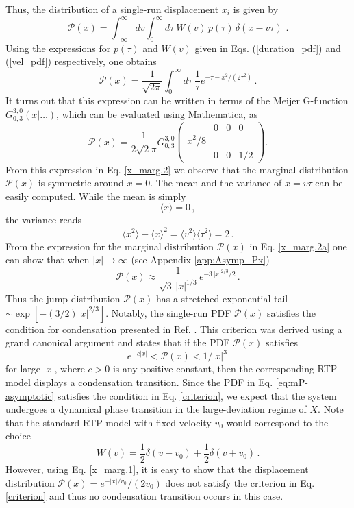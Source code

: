 \documentclass[aps,pre,twocolumn,superscriptaddress,showpacs]{revtex4-1}
\newcommand{\be}{\begin{equation}}
\newcommand{\ee}{\end{equation}}
\newcommand{\mP}{\mathcal{P}}
\begin{document}
Thus, the distribution of a single-run displacement $x_i$ is given by
\be
\mP(x)= \int_{-\infty}^{\infty} dv \int_0^{\infty}d\tau~ W(v)\,p(\tau)\,
\delta(x- v \tau)\, \,. 
\label{x_marg.1}
\ee
Using the expressions for $p(\tau)$ and $W(v)$ given in Eqs. 
(\ref{duration_pdf}) and (\ref{vel_pdf}) respectively, one obtains 
\be 
\mP(x)=\frac{1}{\sqrt{2\pi}}\int_{0}^{\infty}d\tau~\frac{1}{\tau}e^{-\tau-x^2/(2\tau^2)}\,.
\label{x_marg.2a}
\ee
It turns out that this expression can be written in terms of the Meijer G-function $G_{0,3}^{3,0}(x|\ldots)$, which can be evaluated using Mathematica, as
\be
\mP(x)= \frac{1}{2\sqrt{2}\pi} G_{0,3}^{3,0} \left(\begin{array}{c|ccc} & 0 & 0 & 0 \\ x^2/8 &  &  &  \\  & 0 & 0 & 1/2 \end{array}\right).
\label{x_marg.2}
\ee
From this expression in Eq. \eqref{x_marg.2} we observe that the marginal distribution $\mP(x)$ is symmetric around $x=0$. The mean and the variance of $x=v\tau$ can be easily computed. While the mean is simply 
\be
\langle x \rangle =0\,,
\label{mean_x}
\ee
the variance  reads
\be
\langle x^2\rangle- \langle x\rangle^2 =  \langle v^2\rangle \langle \tau^2\rangle =2\,.
\label{var_x}
\ee
From the expression for the marginal distribution $\mP(x)$ in Eq. \eqref{x_marg.2a} one can show that when $|x|\to \infty$ (see Appendix \ref{app:Asymp_Px})
\be \mP(x) \approx \frac{1 }{\sqrt{3}\,
  |x|^{1/3}}\, e^{-3\, | x|^{2/3}/2}\, .
\label{eq:mP-asymptotic}
\ee
Thus the jump distribution $\mP(x)$ has a stretched exponential tail $\sim 
\exp[-(3/2)|x|^{2/3}]$. Notably, the single-run PDF $\mP(x)$ satisfies the condition for condensation presented in Ref. \cite{MLDM21}. This criterion was derived using a grand canonical argument and states that if the PDF $\mP(x)$ satisfies
\begin{equation}
e^{-c|x|}<\mP(x)<1/|x|^3\,
\label{criterion}
\end{equation}
for large $|x|$, where $c>0$ is any positive constant, then the corresponding RTP model displays a condensation transition. Since the PDF in Eq. \eqref{eq:mP-asymptotic} satisfies the condition in Eq. \eqref{criterion}, we expect that the system undergoes a dynamical phase transition in the large-deviation regime of $X$. Note that the standard RTP model with fixed velocity $v_0$ would correspond to the choice
\begin{equation}
W(v)=\frac12\delta(v-v_0)+\frac12\delta(v+v_0)\,.
\end{equation}
However, using Eq. \eqref{x_marg.1}, it is easy to show that the displacement distribution $\mP(x)=e^{-|x|/v_0}/(2v_0)$ does not satisfy the criterion in Eq. \eqref{criterion} and thus no condensation transition occurs in this case.
\end{document}
